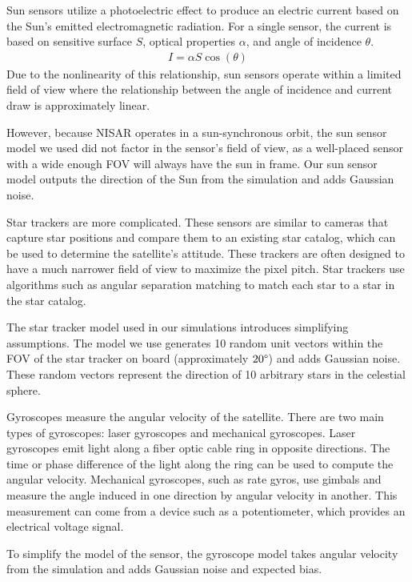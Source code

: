 Sun sensors utilize a photoelectric effect to produce an electric current based on the Sun's emitted electromagnetic radiation. For a single sensor, the current is based on sensitive surface $S$, optical properties $\alpha$, and angle of incidence $\theta$.
\begin{align*}
    I = \alpha S \cos(\theta)
\end{align*}
Due to the nonlinearity of this relationship, sun sensors operate within a limited field of view where the relationship between the angle of incidence and current draw is approximately linear.

However, because NISAR operates in a sun-synchronous orbit, the sun sensor model we used did not factor in the sensor's field of view, as a well-placed sensor with a wide enough FOV will always have the sun in frame. Our sun sensor model outputs the direction of the Sun from the simulation and adds Gaussian noise.

Star trackers are more complicated. These sensors are similar to cameras that capture star positions and compare them to an existing star catalog, which can be used to determine the satellite's attitude. These trackers are often designed to have a much narrower field of view to maximize the pixel pitch. Star trackers use algorithms such as angular separation matching to match each star to a star in the star catalog.

The star tracker model used in our simulations introduces simplifying assumptions. The model we use generates 10 random unit vectors within the FOV of the star tracker on board (approximately $20 \degree$) and adds Gaussian noise. These random vectors represent the direction of 10 arbitrary stars in the celestial sphere.

Gyroscopes measure the angular velocity of the satellite. There are two main types of gyroscopes: laser gyroscopes and mechanical gyroscopes. Laser gyroscopes emit light along a fiber optic cable ring in opposite directions. The time or phase difference of the light along the ring can be used to compute the angular velocity. Mechanical gyroscopes, such as rate gyros, use gimbals and measure the angle induced in one direction by angular velocity in another. This measurement can come from a device such as a potentiometer, which provides an electrical voltage signal.

To simplify the model of the sensor, the gyroscope model takes angular velocity from the simulation and adds Gaussian noise and expected bias.

